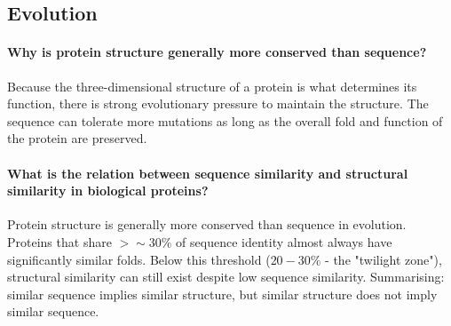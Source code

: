 \subsection{Evolution}

\paragraph{Why is protein structure generally more conserved than sequence?}
Because the three-dimensional structure of a protein is what determines its function, there is strong evolutionary pressure to maintain the structure. The sequence can tolerate more mutations as long as the overall fold and function of the protein are preserved. 

\paragraph{What is the relation between sequence similarity and structural similarity in biological proteins?}
Protein structure is generally more conserved than sequence in evolution.
Proteins that share $>\sim30\%$ of sequence identity almost always have significantly similar
folds. Below this threshold ($20-30\%$ - the "twilight zone"), structural similarity can still exist despite low sequence similarity.
Summarising: similar sequence implies similar structure, but similar structure does not imply
similar sequence.

